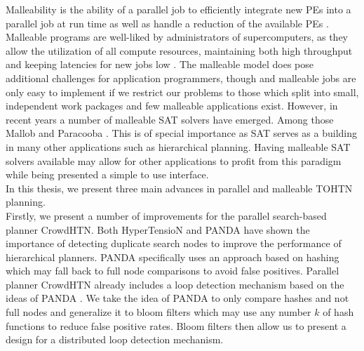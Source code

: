 \documentclass[enabledeprecatedfontcommands,12pt,a4paper,twoside]{scrartcl}
\numberwithin{equation}{section}
\begin{document}
Malleability is the ability of a parallel job to efficiently integrate new PEs into a parallel job at run time as well as handle a reduction of the available PEs \cite{feitelson1997job}. Malleable programs are well-liked by administrators of supercomputers, as they allow the utilization of all compute resources, maintaining both high throughput and keeping latencies for new jobs low \cite{feitelson1997job, hungershofer2004combined}. The malleable model does pose additional challenges for application programmers, though and malleable jobs are only easy to implement if we restrict our problems to those which split into small, independent work packages \cite{feitelson1997job, tucker1989process} and few malleable applications exist. 
However, in recent years a number of malleable SAT solvers have emerged. Among those Mallob \cite{sanders2022decentralized} and Paracooba \cite{heisinger2020distributed}. This is of special importance as SAT serves as a building in many other applications such as hierarchical planning. Having malleable SAT solvers available may allow for other applications to profit from this paradigm while being presented a simple to use interface. \\

In this thesis, we present three main advances in parallel and malleable TOHTN planning. \\
Firstly, we present a number of improvements for the parallel search-based planner CrowdHTN.
Both HyperTensioN \cite{magnaguagno2020hypertension} and PANDA \cite{holler2021loop} have shown the importance of detecting duplicate search nodes to improve the performance of hierarchical planners. PANDA specifically uses an approach based on hashing which may fall back to full node comparisons to avoid false positives. Parallel planner CrowdHTN already includes a loop detection mechanism based on the ideas of PANDA \cite{bretl2021parallel}. We take the idea of PANDA to only compare hashes and not full nodes and generalize it to bloom filters which may use any number $k$ of hash functions to reduce false positive rates. Bloom filters then allow us to present a design for a distributed loop detection mechanism.
\end{document}
